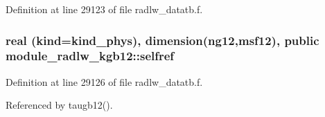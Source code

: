 Definition at line 29123 of file radlw\+\_\+datatb.\+f.

\subsubsection[{\texorpdfstring{selfref}{selfref}}]{\setlength{\rightskip}{0pt plus 5cm}real (kind=kind\+\_\+phys), dimension(ng12,{\bf msf12}), public module\+\_\+radlw\+\_\+kgb12\+::selfref}\hypertarget{namespacemodule__radlw__kgb12_a8aaf83ec7a08a244fd1e5396c9fd9b1d}{}\label{namespacemodule__radlw__kgb12_a8aaf83ec7a08a244fd1e5396c9fd9b1d}


Definition at line 29126 of file radlw\+\_\+datatb.\+f.



Referenced by taugb12().

